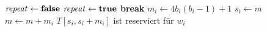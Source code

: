 \begin{algorithm}
\begin{algorithmic}
                                                    \State {}
                                                    \State $\text{\emph{repeat}} \gets \text{\textbf{false}}$
                                                \Else
                                                    \State $\text{\emph{repeat}} \gets \text{\textbf{true}}$
                                                    \State \textbf{break}
                                                \EndIf
                                            \EndFor
                                        \EndWhile
                                    \EndIf
                                \EndIf
                            \EndIf
                        \EndFunction
                        \Statex
                            \State $m_i \gets 4b_i(b_i-1)+1$
                            \State $s_i \gets m$
                            \State $m \gets m + m_i$
                            \State $T[s_i,s_i + m_i]$ ist reserviert für $w_i$
                        \EndFunction
                    \end{algorithmic}
                \end{algorithm}

                        
